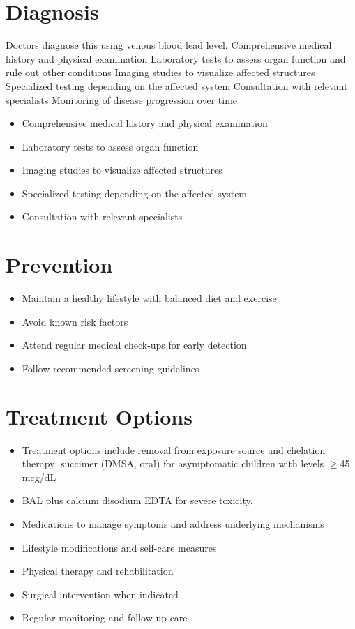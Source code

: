 \section{Diagnosis}
Doctors diagnose this using venous blood lead level. Comprehensive medical history and physical examination Laboratory tests to assess organ function and rule out other conditions Imaging studies to visualize affected structures Specialized testing depending on the affected system Consultation with relevant specialists Monitoring of disease progression over time

\begin{itemize}[noitemsep]
  \item Comprehensive medical history and physical examination
  \item Laboratory tests to assess organ function
  \item Imaging studies to visualize affected structures
  \item Specialized testing depending on the affected system
  \item Consultation with relevant specialists
\end{itemize}
\section{Prevention}
\begin{itemize}[noitemsep]
  \item Maintain a healthy lifestyle with balanced diet and exercise
  \item Avoid known risk factors
  \item Attend regular medical check-ups for early detection
  \item Follow recommended screening guidelines
\end{itemize}
\section{Treatment Options}
\begin{itemize}[noitemsep]
  \item Treatment options include removal from exposure source and chelation therapy: succimer (DMSA, oral) for asymptomatic children with levels $\ge$45 mcg/dL
  \item BAL plus calcium disodium EDTA for severe toxicity.
  \item Medications to manage symptoms and address underlying mechanisms
  \item Lifestyle modifications and self-care measures
  \item Physical therapy and rehabilitation
  \item Surgical intervention when indicated
  \item Regular monitoring and follow-up care
\end{itemize}
